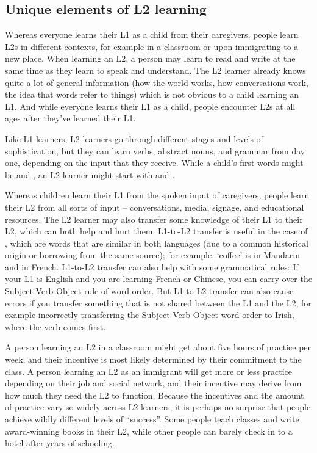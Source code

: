 \subsection{Unique elements of L2 learning} \label{sec:l2}

Whereas everyone learns their L1 as a child from their caregivers, people learn L2s in different contexts, for example in a classroom or upon immigrating to a new place.  When learning an L2, a person may learn to read and write at the same time as they learn to speak and understand.  The L2 learner already knows quite a lot of general information (how the world works, how conversations work, the idea that words refer to things) which is not obvious to a child learning an L1. And while everyone learns their L1 as a child, people encounter L2s at all ages after they've learned their L1.

Like L1 learners, L2 learners go through different stages and levels of sophistication, but they can learn verbs, abstract nouns, and grammar from day one, depending on the input that they receive.  While a child's first words might be  and , an L2 learner might start with  and .


Whereas children learn their L1 from the spoken input of caregivers, people learn their L2 from all sorts of input -- conversations, media, signage, and educational resources.  The L2 learner may also transfer some knowledge of their L1 to their L2, which can both help and hurt them.  L1-to-L2 transfer is useful in the case of , which are words that are similar in both languages (due to a common historical origin or borrowing from the same source); for example,   `coffee' is   in Mandarin and  in French.  L1-to-L2 transfer can also help with some grammatical rules: If your L1 is English and you are learning French or Chinese, you can carry over the Subject-Verb-Object rule of word order.  
But L1-to-L2 transfer can also cause errors if you transfer something that is not shared between the L1 and the L2, for example incorrectly transferring the Subject-Verb-Object word order to Irish, where the verb comes first. 

A person learning an L2 in a classroom might get about five hours of practice per week, and their incentive is most likely determined by their commitment to the class.  A person learning an L2 as an immigrant will get more or less practice depending on their job and social network, and their incentive may derive from how much they need the L2 to function.  Because the incentives and the amount of practice vary so widely across L2 learners, it is perhaps no surprise that people  achieve wildly different levels of ``success''.  Some people teach classes and write award-winning books in their L2, while other people can barely check in to a hotel after years of schooling.

